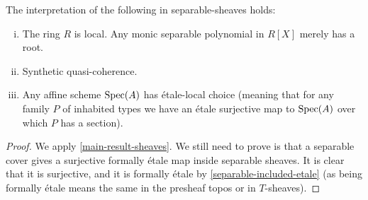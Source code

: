 \begin{theorem}
The interpretation of the following in separable-sheaves holds:
\begin{enumerate}[(i)]
\item The ring $R$ is local. Any monic separable polynomial in $R[X]$ merely has a root.
\item Synthetic quasi-coherence.
\item Any affine scheme $\operatorname{Spec}(A)$ has étale-local choice (meaning that for any family $P$ of inhabited types we have an étale surjective map to $\operatorname{Spec}(A)$ over which $P$ has a section).
\end{enumerate}
\end{theorem}

\begin{proof}
We apply \cref{main-result-sheaves}. We still need to prove is that a separable cover gives a surjective formally étale map inside separable sheaves. It is clear that it is surjective, and it is formally étale by \cref{separable-included-etale} (as being formally étale means the same in the presheaf topos or in $T$-sheaves).
\end{proof}
